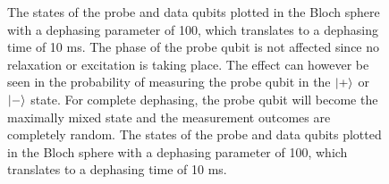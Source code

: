\begin{figure}[H]
	\caption[oddeven]{The states of the probe and data qubits plotted in the Bloch sphere with a dephasing parameter of 100, which translates to a dephasing time of 10 ms. The phase of the probe qubit is not affected since no relaxation or excitation is taking place. The effect can however be seen in the probability of measuring the probe qubit in the $\ket{+}$ or $\ket{-}$ state. For complete dephasing, the probe qubit will become the maximally mixed state and the measurement outcomes are completely random. The states of the probe and data qubits plotted in the Bloch sphere with a dephasing parameter of 100, which translates to a dephasing time of 10 ms.}
	\label{FIG:deph}
\end{figure}










